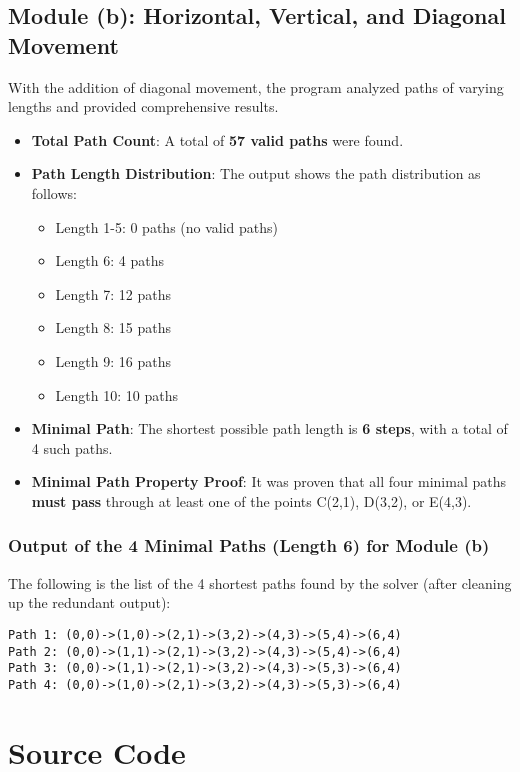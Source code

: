 \documentclass[11pt,a4paper
]{article}
\begin{document}
\subsection*{Module (b): Horizontal, Vertical, and Diagonal Movement}
With the addition of diagonal movement, the program analyzed paths of varying lengths and provided comprehensive results.

\begin{itemize}
  \item \textbf{Total Path Count}: A total of \textbf{57 valid paths} were found.
  \item \textbf{Path Length Distribution}: The output shows the path distribution as follows:
        \begin{itemize}
          \item Length 1-5: 0 paths (no valid paths)
          \item Length 6: 4 paths
          \item Length 7: 12 paths
          \item Length 8: 15 paths
          \item Length 9: 16 paths
          \item Length 10: 10 paths
        \end{itemize}
  \item \textbf{Minimal Path}: The shortest possible path length is \textbf{6 steps}, with a total of 4 such paths.
  \item \textbf{Minimal Path Property Proof}: It was proven that all four minimal paths \textbf{must pass} through at least one of the points C(2,1), D(3,2), or E(4,3).
\end{itemize}

\subsubsection*{Output of the 4 Minimal Paths (Length 6) for Module (b)}
The following is the list of the 4 shortest paths found by the solver (after cleaning up the redundant output):
\begin{verbatim}
Path 1: (0,0)->(1,0)->(2,1)->(3,2)->(4,3)->(5,4)->(6,4)
Path 2: (0,0)->(1,1)->(2,1)->(3,2)->(4,3)->(5,4)->(6,4)
Path 3: (0,0)->(1,1)->(2,1)->(3,2)->(4,3)->(5,3)->(6,4)
Path 4: (0,0)->(1,0)->(2,1)->(3,2)->(4,3)->(5,3)->(6,4)
\end{verbatim}

\newpage
\section*{Source Code}
\inputminted{python}{../EASproject.py}
\end{document}
